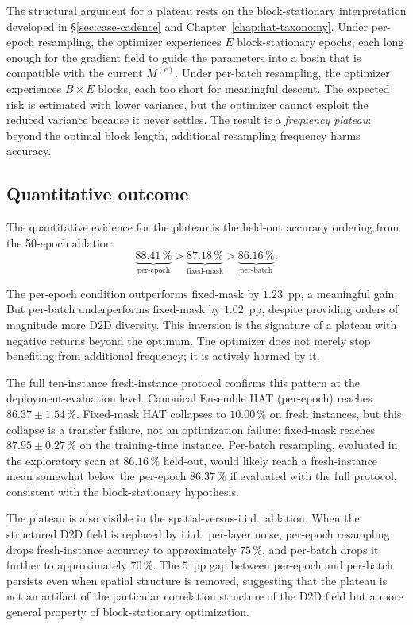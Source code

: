The structural argument for a plateau rests on the block-stationary interpretation developed in \S\ref{sec:case-cadence} and Chapter~\ref{chap:hat-taxonomy}. Under per-epoch resampling, the optimizer experiences $E$ block-stationary epochs, each long enough for the gradient field to guide the parameters into a basin that is compatible with the current $M^{(e)}$. Under per-batch resampling, the optimizer experiences $B\times E$ blocks, each too short for meaningful descent. The expected risk is estimated with lower variance, but the optimizer cannot exploit the reduced variance because it never settles. The result is a \emph{frequency plateau}: beyond the optimal block length, additional resampling frequency harms accuracy.

\subsection{Quantitative outcome}

The quantitative evidence for the plateau is the held-out accuracy ordering from the 50-epoch ablation:
\begin{equation}
    \underbrace{88.41\,\%}_{\text{per-epoch}} > \underbrace{87.18\,\%}_{\text{fixed-mask}} > \underbrace{86.16\,\%}_{\text{per-batch}}.
    \label{eq:plateau-ordering}
\end{equation}

The per-epoch condition outperforms fixed-mask by $1.23$~pp, a meaningful gain. But per-batch underperforms fixed-mask by $1.02$~pp, despite providing orders of magnitude more D2D diversity. This inversion is the signature of a plateau with negative returns beyond the optimum. The optimizer does not merely stop benefiting from additional frequency; it is actively harmed by it.

The full ten-instance fresh-instance protocol confirms this pattern at the deployment-evaluation level. Canonical Ensemble HAT (per-epoch) reaches $86.37\pm1.54\,\%$. Fixed-mask HAT collapses to $10.00\,\%$ on fresh instances, but this collapse is a transfer failure, not an optimization failure: fixed-mask reaches $87.95\pm0.27\,\%$ on the training-time instance. Per-batch resampling, evaluated in the exploratory scan at $86.16\,\%$ held-out, would likely reach a fresh-instance mean somewhat below the per-epoch $86.37\,\%$ if evaluated with the full protocol, consistent with the block-stationary hypothesis.

The plateau is also visible in the spatial-versus-i.i.d.~ablation. When the structured D2D field is replaced by i.i.d.~per-layer noise, per-epoch resampling drops fresh-instance accuracy to approximately $75\,\%$, and per-batch drops it further to approximately $70\,\%$. The $5$~pp gap between per-epoch and per-batch persists even when spatial structure is removed, suggesting that the plateau is not an artifact of the particular correlation structure of the D2D field but a more general property of block-stationary optimization.

